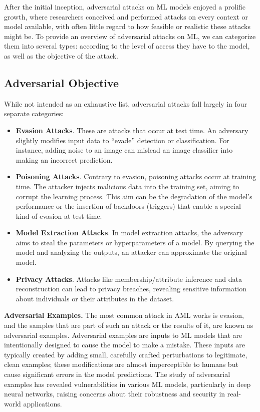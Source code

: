 After the initial inception, adversarial attacks on ML models enjoyed a prolific growth, where researchers conceived and performed attacks on every context or model available, with often little regard to how feasible or realistic these attacks might be.
To provide an overview of adversarial attacks on \gls{ML}, we can categorize them into several types: according to the level of access they have to the model, as well as the objective of the attack.

\subsection{Adversarial Objective}

While not intended as an exhaustive list, adversarial attacks fall largely in four separate categories:

\begin{itemize}
    \item \textbf{Evasion Attacks}. These are attacks that occur at test time. An adversary slightly modifies input data to ``evade'' detection or classification. For instance, adding noise to an image can mislead an image classifier into making an incorrect prediction.
    \item \textbf{Poisoning Attacks}. Contrary to evasion, poisoning attacks occur at training time. The attacker injects malicious data into the training set, aiming to corrupt the learning process. This aim can be the degradation of the model's performance or the insertion of backdoors (triggers) that enable a special kind of evasion at test time.
    \item \textbf{Model Extraction Attacks}. In model extraction attacks, the adversary aims to steal the parameters or hyperparameters of a model. By querying the model and analyzing the outputs, an attacker can approximate the original model.
    \item \textbf{Privacy Attacks}. Attacks like membership/attribute inference and data reconstruction can lead to privacy breaches, revealing sensitive information about individuals or their attributes in the dataset.
\end{itemize}

\textbf{Adversarial Examples.} The most common attack in \gls{AML} works is evasion, and the samples that are part of such an attack or the results of it, are known as adversarial examples.
Adversarial examples are inputs to \gls{ML} models that are intentionally designed to cause the model to make a mistake.
These inputs are typically created by adding small, carefully crafted perturbations to legitimate, clean examples; these modifications are almost imperceptible to humans but cause significant errors in the model predictions.
The study of adversarial examples has revealed vulnerabilities in various \gls{ML} models, particularly in deep neural networks, raising concerns about their robustness and security in real-world applications.

